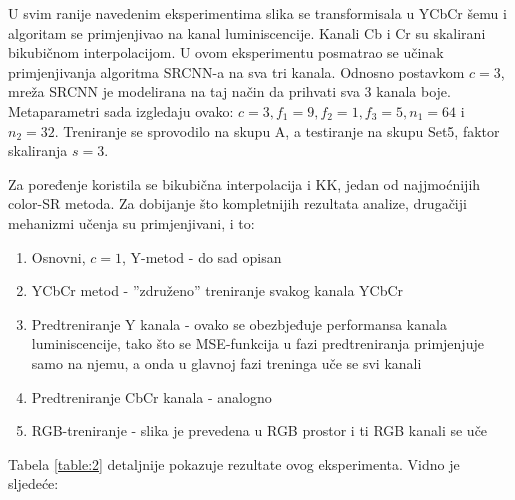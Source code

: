 \documentclass[12pt]{report}
\numberwithin{equation}{section}
\begin{document}
  U svim ranije navedenim eksperimentima slika se transformisala u YCbCr šemu i algoritam se primjenjivao na kanal luminiscencije. Kanali Cb i Cr su skalirani bikubičnom interpolacijom. U ovom eksperimentu posmatrao se učinak primjenjivanja algoritma SRCNN-a na sva tri kanala. Odnosno postavkom $c=3$, mreža SRCNN je modelirana na taj način da prihvati sva 3 kanala boje. Metaparametri sada izgledaju ovako: $c = 3, f_1 = 9, f_2 = 1, f_3 = 5, n_1 = 64$ i $n_2 = 32$. Treniranje se sprovodilo na skupu A, a testiranje na skupu Set5, faktor skaliranja $s=3$. 
   
  Za poređenje koristila se bikubična interpolacija i KK, jedan od najjmoćnijih color-SR metoda. Za dobijanje što kompletnijih rezultata analize, drugačiji mehanizmi učenja su primjenjivani, i to:
  
  \begin{enumerate}
  
   \item Osnovni, $c=1$, Y-metod - do sad opisan
   \item YCbCr metod - ''združeno'' treniranje svakog kanala YCbCr
   \item Predtreniranje Y kanala - ovako se obezbjeđuje performansa kanala luminiscencije, tako što se MSE-funkcija u fazi predtreniranja primjenjuje samo na njemu, a onda u glavnoj fazi treninga uče se svi kanali  
   \item Predtreniranje CbCr kanala - analogno
   \item RGB-treniranje - slika je prevedena u RGB prostor i ti RGB kanali se uče
   
  \end{enumerate}
     
  
\newpage
 Tabela \ref{table:2} detaljnije pokazuje rezultate ovog eksperimenta. Vidno je sljedeće:
  
\end{document}
